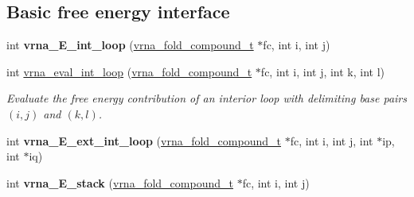 \subsection*{Basic free energy interface}
\begin{DoxyCompactItemize}
\item 
\mbox{\label{group__eval__loops__int_gab927db1b264b253a9acd5e63ab5404a1}} 
int {\bfseries vrna\+\_\+\+E\+\_\+int\+\_\+loop} (\hyperlink{group__fold__compound_ga1b0cef17fd40466cef5968eaeeff6166}{vrna\+\_\+fold\+\_\+compound\+\_\+t} $\ast$fc, int i, int j)
\item 
int \hyperlink{group__eval__loops__int_gaab3547bfcdc39d89babbc7ed2a1a4b65}{vrna\+\_\+eval\+\_\+int\+\_\+loop} (\hyperlink{group__fold__compound_ga1b0cef17fd40466cef5968eaeeff6166}{vrna\+\_\+fold\+\_\+compound\+\_\+t} $\ast$fc, int i, int j, int k, int l)
\begin{DoxyCompactList}\small\item\em Evaluate the free energy contribution of an interior loop with delimiting base pairs $(i,j)$ and $(k,l)$. \end{DoxyCompactList}\item 
\mbox{\label{group__eval__loops__int_gadad05dffc71e28377acdcedde9a3d9fc}} 
int {\bfseries vrna\+\_\+\+E\+\_\+ext\+\_\+int\+\_\+loop} (\hyperlink{group__fold__compound_ga1b0cef17fd40466cef5968eaeeff6166}{vrna\+\_\+fold\+\_\+compound\+\_\+t} $\ast$fc, int i, int j, int $\ast$ip, int $\ast$iq)
\item 
\mbox{\label{group__eval__loops__int_ga75bade120c653de9959a1e0eab879ab9}} 
int {\bfseries vrna\+\_\+\+E\+\_\+stack} (\hyperlink{group__fold__compound_ga1b0cef17fd40466cef5968eaeeff6166}{vrna\+\_\+fold\+\_\+compound\+\_\+t} $\ast$fc, int i, int j)
\end{DoxyCompactItemize}
